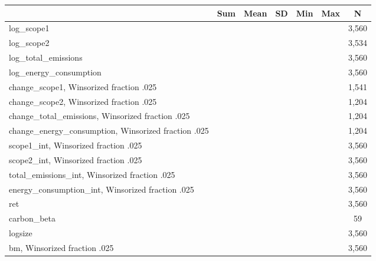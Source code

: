 {
\def\sym#1{\ifmmode^{#1}\else\(^{#1}\)\fi}
\begin{tabular}{l*{1}{cccccc}}
\toprule
                    &         Sum&        Mean&          SD&         Min&         Max&           N\\
\midrule
log\_scope1          &            &            &            &            &            &       3,560\\
log\_scope2          &            &            &            &            &            &       3,534\\
log\_total\_emissions &            &            &            &            &            &       3,560\\
log\_energy\_consumption&            &            &            &            &            &       3,560\\
change\_scope1, Winsorized fraction .025&            &            &            &            &            &       1,541\\
change\_scope2, Winsorized fraction .025&            &            &            &            &            &       1,204\\
change\_total\_emissions, Winsorized fraction .025&            &            &            &            &            &       1,204\\
change\_energy\_consumption, Winsorized fraction .025&            &            &            &            &            &       1,204\\
scope1\_int, Winsorized fraction .025&            &            &            &            &            &       3,560\\
scope2\_int, Winsorized fraction .025&            &            &            &            &            &       3,560\\
total\_emissions\_int, Winsorized fraction .025&            &            &            &            &            &       3,560\\
energy\_consumption\_int, Winsorized fraction .025&            &            &            &            &            &       3,560\\
ret                 &            &            &            &            &            &       3,560\\
carbon\_beta         &            &            &            &            &            &          59\\
logsize             &            &            &            &            &            &       3,560\\
bm, Winsorized fraction .025&            &            &            &            &            &       3,560\\

\end{tabular}}
